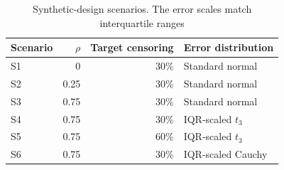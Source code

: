 \begin{table}[htbp]
\centering\small
\caption{Synthetic-design scenarios. The error scales match interquartile ranges}
\label{tab:scenarios}
\begin{tabular}{@{}lrrl@{}}
\toprule
Scenario & $\rho$ & Target censoring & Error distribution \\
\midrule
S1 & 0 & 30\% & Standard normal \\
S2 & 0.25 & 30\% & Standard normal \\
S3 & 0.75 & 30\% & Standard normal \\
S4 & 0.75 & 30\% & IQR-scaled $t_3$ \\
S5 & 0.75 & 60\% & IQR-scaled $t_3$ \\
S6 & 0.75 & 30\% & IQR-scaled Cauchy \\
\bottomrule
\end{tabular}
\end{table}
